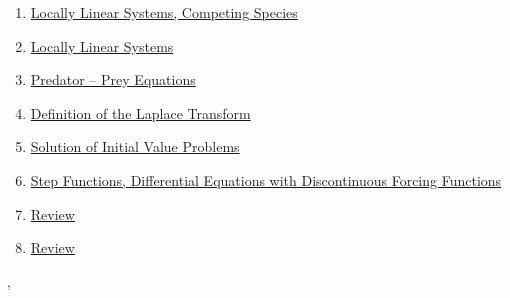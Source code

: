 \documentclass[11pt]{article}
\renewcommand{\today}{\shortmonthname[\the\month] \the \day,  \the\year}
\begin{document}
\begin{enumerate}
	\item \href{https://mp.weixin.qq.com/s/N0gHKFvt9Nn-F1QlBsJkdA}{Locally Linear Systems, Competing Species}	%
	\item \href{https://mp.weixin.qq.com/s/r6Mqoth9cHmov3XbxloJZw}{Locally Linear Systems}	%
	\item \href{https://mp.weixin.qq.com/s/Cdh-MA84hw01IxLqUpnffw}{Predator -- Prey Equations}	%
	\item \href{https://mp.weixin.qq.com/s/ynglUZNv2aW6QrgkRvsrdQ}{Definition of the Laplace Transform}	%
	\item \href{https://mp.weixin.qq.com/s/2dj0YdVPvtUQfw-_5MK63A}{Solution of Initial Value Problems}	%
	\item \href{https://mp.weixin.qq.com/s/YzltP8uHwcBwqvjgCURG7w}{Step Functions, Differential Equations with Discontinuous Forcing Functions}	%
	\item \href{https://mp.weixin.qq.com/s/3ybBHYM1jZ9RtSQZcsNZWQ}{Review}	%
	\item \href{https://mp.weixin.qq.com/s/J0vWTq2Kra9LIVxgWwPU_g}{Review}	%
\end{enumerate}




%
\begin{flushright}
	\tiny \today 
\end{flushright}
\end{document}
